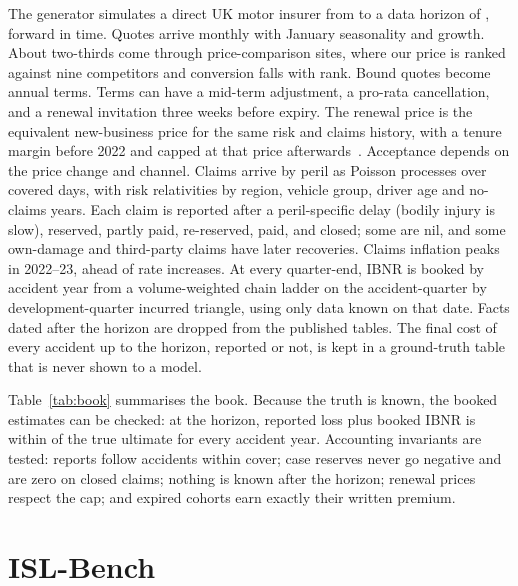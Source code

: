 \documentclass[11pt]{article}
\begin{document}
The generator simulates a direct UK motor insurer from \BookStart{} to a data horizon of \BookHorizon{}, forward
in time. Quotes arrive monthly with January seasonality and growth. About two-thirds come through
price-comparison sites, where our price is ranked against nine competitors and conversion falls with rank. Bound
quotes become annual terms. Terms can have a mid-term adjustment, a pro-rata cancellation, and a renewal
invitation three weeks before expiry. The renewal price is the equivalent new-business price for the same risk
and claims history, with a tenure margin before 2022 and capped at that price afterwards~\cite{fca2021ps215}.
Acceptance depends on the price change and channel. Claims arrive by peril as Poisson processes over covered
days, with risk relativities by region, vehicle group, driver age and no-claims years. Each claim is reported
after a peril-specific delay (bodily injury is slow), reserved, partly paid, re-reserved, paid, and closed;
some are nil, and some own-damage and third-party claims have later recoveries. Claims inflation peaks in
2022--23, ahead of rate increases. At every quarter-end, IBNR is booked by accident year from a volume-weighted
chain ladder on the accident-quarter by development-quarter incurred triangle, using only data known on that
date. Facts dated after the horizon are dropped from the published tables. The final cost of every accident up
to the horizon, reported or not, is kept in a ground-truth table that is never shown to a model.



Table~\ref{tab:book} summarises the book. Because the truth is known, the booked estimates can be checked: at
the horizon, reported loss plus booked IBNR is within \IbnrErrRange{} of the true ultimate for every accident
year. Accounting invariants are tested: reports follow accidents within cover; case reserves never go negative
and are zero on closed claims; nothing is known after the horizon; renewal prices respect the cap; and expired
cohorts earn exactly their written premium.

\section{ISL-Bench}\label{sec:bench}
\end{document}

